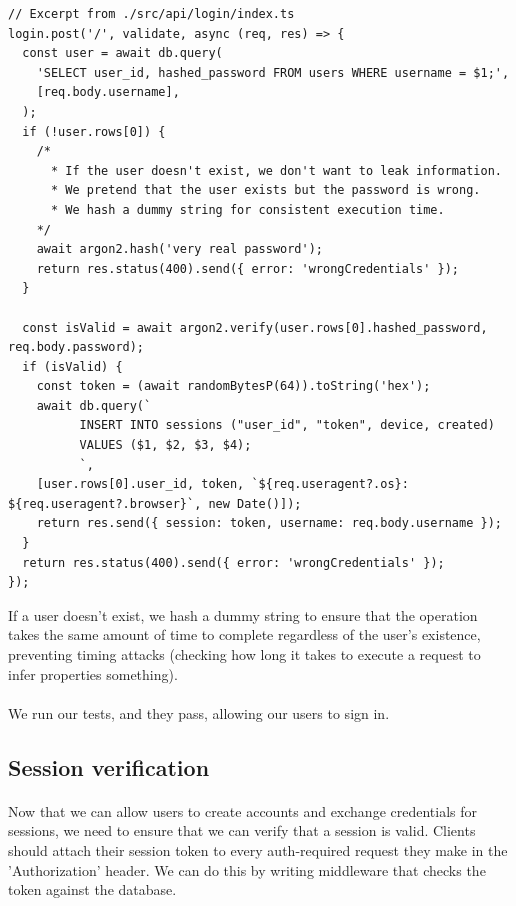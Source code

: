 \documentclass{report}
\begin{document}
\begin{verbatim}
// Excerpt from ./src/api/login/index.ts
login.post('/', validate, async (req, res) => {
  const user = await db.query(
    'SELECT user_id, hashed_password FROM users WHERE username = $1;',
    [req.body.username],
  );
  if (!user.rows[0]) {
    /*
      * If the user doesn't exist, we don't want to leak information.
      * We pretend that the user exists but the password is wrong.
      * We hash a dummy string for consistent execution time.
    */
    await argon2.hash('very real password');
    return res.status(400).send({ error: 'wrongCredentials' });
  }

  const isValid = await argon2.verify(user.rows[0].hashed_password, req.body.password);
  if (isValid) {
    const token = (await randomBytesP(64)).toString('hex');
    await db.query(`
          INSERT INTO sessions ("user_id", "token", device, created)
          VALUES ($1, $2, $3, $4);
          `,
    [user.rows[0].user_id, token, `${req.useragent?.os}: ${req.useragent?.browser}`, new Date()]);
    return res.send({ session: token, username: req.body.username });
  }
  return res.status(400).send({ error: 'wrongCredentials' });
});
\end{verbatim}

If a user doesn't exist, we hash a dummy string to ensure that the operation takes the same amount of time to complete regardless of the user's existence, preventing timing attacks (checking how long it takes to execute a request to infer properties something). 

\paragraph{}
We run our tests, and they pass, allowing our users to sign in.

\subsection{Session verification}
\paragraph{}
Now that we can allow users to create accounts and exchange credentials for sessions, we need to ensure that we can verify that a session is valid. Clients should attach their session token to every auth-required request they make in the 'Authorization' header. We can do this by writing middleware that checks the token against the database.

\printbibliography
\end{document}
